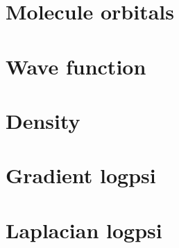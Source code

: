 \documentclass{article}
\begin{document}
\section{Molecule orbitals}

\section{Wave function}

\section{Density}

\section{Gradient logpsi}

\section{Laplacian logpsi}
\end{document}
